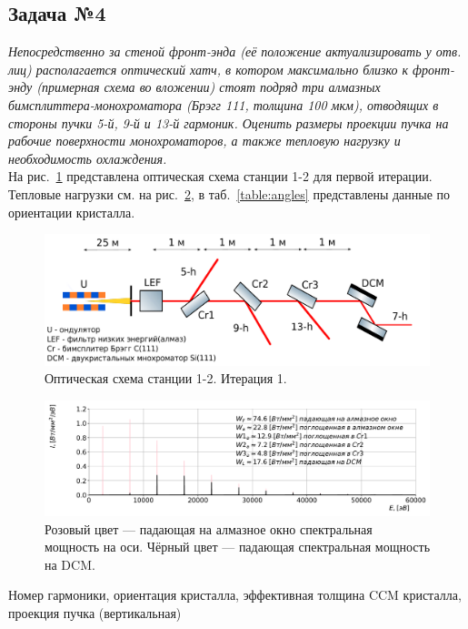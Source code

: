 \documentclass[14pt,a4paper]{extarticle}
\numberwithin{equation}{section}
\begin{document}
	\subsection{Задача №4}
	\textit{Непосредственно за стеной фронт-энда (её положение актуализировать у отв. лиц) располагается оптический хатч, в котором максимально близко к фронт-энду (примерная схема во вложении) стоят подряд три алмазных бимсплиттера-монохроматора (Брэгг 111, толщина 100 мкм), отводящих в стороны пучки 5-й, 9-й и 13-й гармоник. Оценить размеры проекции пучка на рабочие поверхности монохроматоров, а также тепловую нагрузку и необходимость охлаждения.}\\
	На рис.~\ref{fig:OptScheme} представлена оптическая схема станции 1-2 для первой итерации. Тепловые нагрузки см. на рис.~\ref{fig:absorb_spec}, в таб.~\ref{table:angles} представлены данные по ориентации кристалла.\\
	\begin{figure}[htbp]
		\centering  
		\includegraphics[width=\textwidth]{pic/OptScheme.pdf}
		\caption{Оптическая схема станции 1-2. Итерация 1.}
		\label{fig:OptScheme}
	\end{figure}
	\begin{figure}[htbp]
		\centering  
		\includegraphics[width=\textwidth]{pic/spec.pdf}
		\caption{Розовый цвет --- падающая на алмазное окно спектральная мощность на оси. Чёрный цвет --- падающая спектральная мощность на DCM.}
		\label{fig:absorb_spec}
	\end{figure}
	
	\begin{table}[h!]
		\renewcommand*\dtlrealalign{S}
		\caption{Номер гармоники, ориентация кристалла, эффективная толщина CCM кристалла, проекция пучка (вертикальная) }
		\centering
		\label{table:angles}
	\end{table}
	
\end{document}
